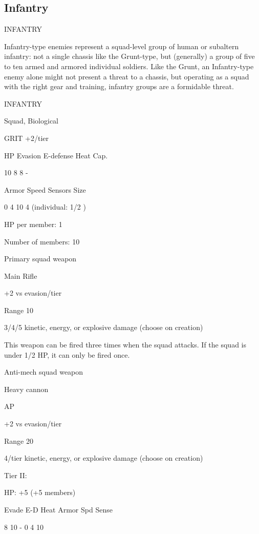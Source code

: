 \subsection{Infantry}
                                               INFANTRY

Infantry-type enemies represent a squad-level group of human or subaltern infantry: not a single
chassis like the Grunt-type, but (generally) a group of five to ten armed and armored individual
soldiers. Like the Grunt, an Infantry-type enemy alone might not present a threat to a chassis, but
operating as a squad with the right gear and training, infantry groups are a formidable threat.

       INFANTRY

       Squad, Biological

       GRIT +2/tier

       HP         Evasion      E-defense     Heat Cap.

       10         8            8             -

       Armor      Speed       Sensors        Size

       0          4            10            4 (individual:
                                             1/2 )

HP per member: 1

Number of members: 10


Primary squad weapon

Main Rifle

+2 vs evasion/tier

Range 10

3/4/5 kinetic, energy, or explosive damage (choose on creation)

This weapon can be fired three times when the squad attacks. If the squad is under 1/2 HP, it can
only be fired once.


Anti-mech squad weapon

Heavy cannon

AP

+2 vs evasion/tier

Range 20

4/tier kinetic, energy, or explosive damage (choose on creation)


Tier II:

HP: +5 (+5 members)


       Evade    E-D    Heat    Armor       Spd      Sense




        8         10     -        0            4         10

